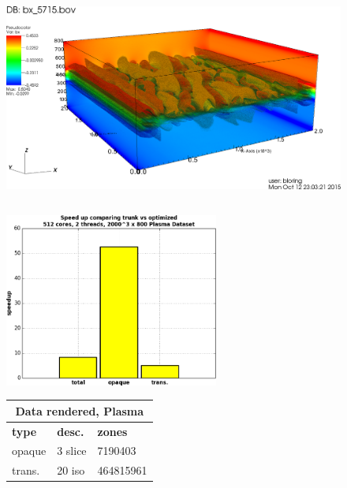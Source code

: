 \documentclass[a4paper,10pt]{report}
\begin{document}
\begin{figure}[ht]
\centering
\includegraphics[height=3.0in]{./vpic_test_case_0030.png}
\begin{minipage}[c]{0.46\textwidth}
\begin{center}
\includegraphics[height=2.25in]{./speed_up_vpic.png} 
\end{center}
\end{minipage}
\begin{minipage}{0.5\textwidth}
{\footnotesize
\def\arraystretch{1.25}
\begin{tabular}{|l|l|l|}
\hline
\multicolumn{3}{|c|}{\bf{Data rendered, Plasma}} \\ \hline
{\bf type} & {\bf desc.} & {\bf zones} \\ \hline
opaque & 3 slice &  7190403 \\ \hline
trans. & 20 iso & 464815961 \\ \hline
\end{tabular}}%
\hspace{-0.1in}{\footnotesize
}
\end{minipage}
\end{figure}
\end{document}
